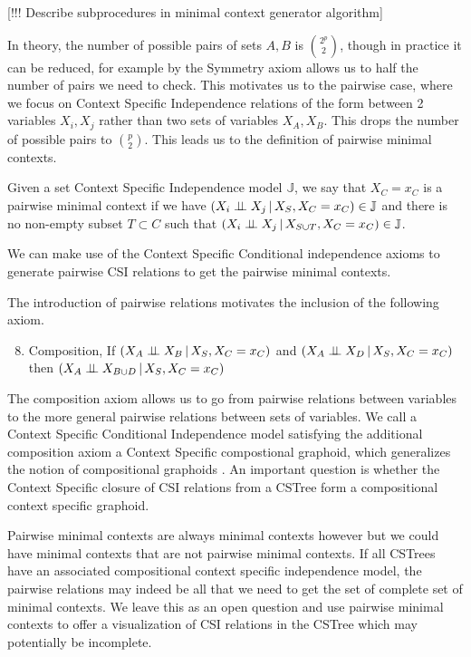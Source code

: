\documentclass{tufte-book}
\begin{document}
[!!! Describe subprocedures in minimal context generator algorithm]

In theory, the number of possible pairs of sets \(A,B\) is \({2^p}\choose{2}\), though in practice it can be reduced, for example by the Symmetry axiom allows us to half the number of pairs we need to check. This motivates us to the pairwise case, where we focus on Context Specific Independence relations of the form between 2 variables \(X_i,X_j\) rather than two sets of variables \(X_A,X_B\). This drops the number of possible pairs to \(p \choose 2\). This leads us to the definition of pairwise minimal contexts.

 \newpage 
\begin{definition}\label{def:pairmcs}
Given a set Context Specific Independence model $\mathbb{J}$, we say that ${X_C=x_C}$ is a pairwise minimal context if we have $(X_i  \perp \!\!\! \perp X_j \,|\, X_S, X_C=x_C) \in \mathbb{J}$ and there is no non-empty subset $T \subset C$ such that $(X_i \perp \!\!\! \perp X_j \,|\, X_{S \cup T}, X_C=x_C) \in \mathbb{J}$.
\end{definition}

We can make use of the Context Specific Conditional independence axioms to generate pairwise CSI relations to get the pairwise minimal contexts.


The introduction of pairwise relations motivates the inclusion of the following axiom.
\begin{enumerate}
\setcounter{enumi}{7}
\item Composition, If \((X_A \perp \!\!\! \perp X_B \,|\, X_S, X_C=x_C)\) and \((X_A \perp \!\!\! \perp X_D \,|\,X_S,X_C=x_C)\) then \((X_A \perp \!\!\! \perp X_{B\cup D} \,|\,X_S,X_C=x_C)\)
\end{enumerate}


The composition axiom allows us to go from pairwise relations between variables to the more general pairwise relations between sets of variables. We call a Context Specific Conditional Independence model satisfying the additional composition axiom a Context Specific compostional graphoid, which generalizes the notion of compositional graphoids \cite{sadeghi-2014-markov-proper}. An important question is whether the Context Specific closure of CSI relations from a CSTree form a compositional context specific graphoid.


Pairwise minimal contexts are always minimal contexts however but we could have minimal contexts that are not pairwise minimal contexts. If all CSTrees have an associated compositional context specific independence model, the pairwise relations may indeed be all that we need to get the set of complete set of minimal contexts. We leave this as an open question and use pairwise minimal contexts to offer a visualization of CSI relations in the CSTree which may potentially be incomplete.
\end{document}
